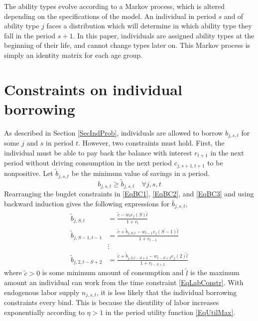 \documentclass[letterpaper,12pt]{article}
\theoremstyle{definition}
\begin{document}
  The ability types evolve according to a Markov process, which is altered depending on the specifications of the model.  An individual in period $s$ and of ability type $j$ faces a distribution which will determine in which ability type they fall in the period $s+1$.  In this paper, individuals are assigned ability types at the beginning of their life, and cannot change types later on.  This Markov process is simply an identity matrix for each age group.



\newpage
\section{Constraints on individual borrowing}\label{AppBorConstr}

  \setcounter{equation}{0}

  As described in Section \ref{SecIndProb}, individuals are allowed to borrow $b_{j,s,t}$ for some $j$ and $s$ in period $t$. However, two constraints must hold. First, the individual must be able to pay back the balance with interest $r_{t+1}$ in the next period without driving consumption in the next period $c_{j,s+1,t+1}$ to be nonpositive. Let $\tilde{b}_{j,s,t}$ be the minimum value of savings in a period.
  \begin{equation}\label{EqSavMin}
    b_{j,s,t}\geq\tilde{b}_{j,s,t} \quad\forall j,s,t
  \end{equation}
  Rearranging the bugdet constraints in \eqref{EqBC1}, \eqref{EqBC2}, and \eqref{EqBC3} and using backward induction gives the following expressions for $\bar{b}_{j,s,t}$,
  \begin{equation}\label{EqBorConsts}
    \begin{split}
      \tilde{b}_{j,S,t} &= \frac{\tilde{c} - w_te_j(S)\tilde{l}}{1+r_t}  \\
      \tilde{b}_{j,S-1,t-1} &= \frac{\tilde{c} + \tilde{b}_{j,S,t} - w_{t-1}e_j(S-1)\tilde{l}}{1+r_{t-1}} \\
      &\vdots \\
      \tilde{b}_{j,2,t-S+2} &= \frac{\tilde{c} + \tilde{b}_{j,3,t-S+3} - w_{t-S+2}e_j(2)\tilde{l}}{1+r_{t-S+2}}
    \end{split}
  \end{equation}
  where $\tilde{c}>0$ is some minimum amount of consumption and $\tilde{l}$ is the maximum amount an individual can work from the time constraint \eqref{EqLabConstr}. With endogenous labor supply $n_{j,s,t}$, it is less likely that the individual borrowing constraints every bind. This is because the disutility of labor increases exponentially according to $\eta>1$ in the period utility function \eqref{EqUtilMax}.
\end{document}
